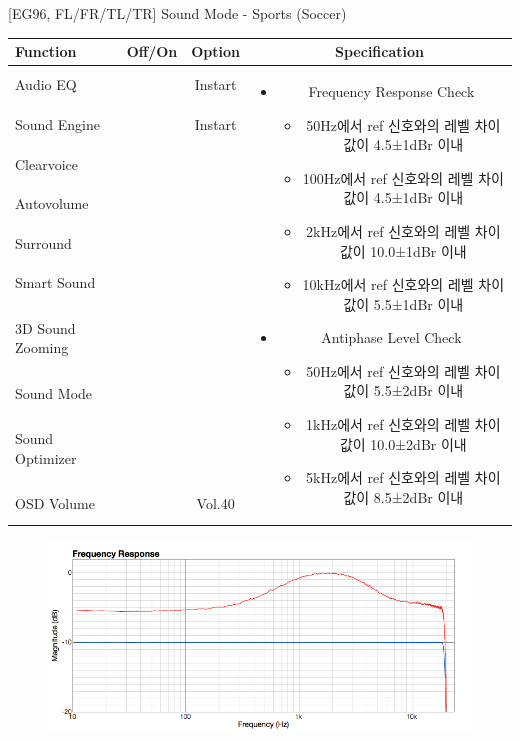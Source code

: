 \documentclass{beamer}
\begin{document}
\begin{frame}[t]{[EG96, FL/FR/TL/TR] Sound Mode - Sports (Soccer)}
\begin{tiny}
\begin{tabular}{@{}lccc@{}}
\toprule
Function & Off/On & Option & Specification \\
\midrule
Audio EQ & \color{black}{Off} & Instart &
\multirow{10}{60mm}{
\begin{itemize}
\item Frequency Response Check
	\begin{itemize}
	\item 50Hz에서 ref 신호와의 레벨 차이값이 4.5±1dBr 이내
	\item 100Hz에서 ref 신호와의 레벨 차이값이 4.5±1dBr 이내
	\item 2kHz에서 ref 신호와의 레벨 차이값이 10.0±1dBr 이내
	\item 10kHz에서 ref 신호와의 레벨 차이값이 5.5±1dBr 이내
	\end{itemize}
\item Antiphase Level Check
	\begin{itemize}
	\item 50Hz에서 ref 신호와의 레벨 차이값이 5.5±2dBr 이내
	\item 1kHz에서 ref 신호와의 레벨 차이값이 10.0±2dBr 이내
	\item 5kHz에서 ref 신호와의 레벨 차이값이 8.5±2dBr 이내
	\end{itemize}
\end{itemize}
} \\
Sound Engine & \color{blue}{On} & Instart & \\
Clearvoice & \color{black}{Off} & & \\
Autovolume & \color{black}{Off} & & \\
Surround & \color{black}{Off} & & \\
Smart Sound & \color{black}{Off} & & \\
3D Sound Zooming & \color{black}{Off} & & \\
Sound Mode & \color{blue}{On} & \color{blue}{Sports} & \\
Sound Optimizer & \color{black}{Off} & & \\
OSD Volume & \color{blue}{On} & Vol.40 & \\
\midrule
\end{tabular}
\end{tiny}

\begin{figure}[b]
\includegraphics[height=0.4\textwidth]{figure/EG96/sports.png}
\end{figure}

\end{frame}
\end{document}
